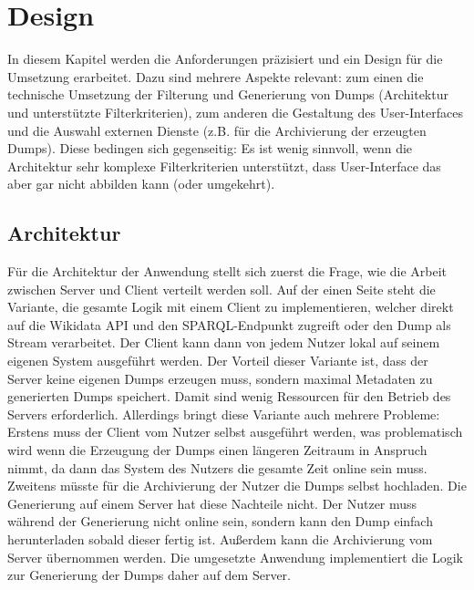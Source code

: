 \chapter{Design}
\label{chap:design}
In diesem Kapitel werden die Anforderungen präzisiert und ein Design für die Umsetzung erarbeitet.
Dazu sind mehrere Aspekte relevant: zum einen die technische Umsetzung der Filterung und Generierung von Dumps (Architektur und unterstützte Filterkriterien), zum anderen die Gestaltung des User-Interfaces und die Auswahl externen Dienste (z.B. für die Archivierung der erzeugten Dumps).
Diese bedingen sich gegenseitig: Es ist wenig sinnvoll, wenn die Architektur sehr komplexe Filterkriterien unterstützt, dass User-Interface das aber gar nicht abbilden kann (oder umgekehrt).

\section{Architektur}
Für die Architektur der Anwendung stellt sich zuerst die Frage, wie die Arbeit zwischen Server und Client verteilt werden soll.
Auf der einen Seite steht die Variante, die gesamte Logik mit einem Client zu implementieren, welcher direkt auf die Wikidata API und den SPARQL-Endpunkt zugreift oder den Dump als Stream verarbeitet.
Der Client kann dann von jedem Nutzer lokal auf seinem eigenen System ausgeführt werden.
Der Vorteil dieser Variante ist, dass der Server keine eigenen Dumps erzeugen muss, sondern maximal Metadaten zu generierten Dumps speichert.
Damit sind wenig Ressourcen für den Betrieb des Servers erforderlich.
Allerdings bringt diese Variante auch mehrere Probleme: Erstens muss der Client vom Nutzer selbst ausgeführt werden, was problematisch wird wenn die Erzeugung der Dumps einen längeren Zeitraum in Anspruch nimmt, da dann das System des Nutzers die gesamte Zeit online sein muss.
Zweitens müsste für die Archivierung der Nutzer die Dumps selbst hochladen.
Die Generierung auf einem Server hat diese Nachteile nicht.
Der Nutzer muss während der Generierung nicht online sein, sondern kann den Dump einfach herunterladen sobald dieser fertig ist.
Außerdem kann die Archivierung vom Server übernommen werden.
Die umgesetzte Anwendung implementiert die Logik zur Generierung der Dumps daher auf dem Server.

